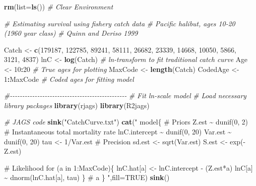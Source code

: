 \documentclass[
]{krantz}
\makeatletter
\newenvironment{Shaded}{\begin{snugshade}}{\end{snugshade}}
\newcommand{\AttributeTok}[1]{\textcolor[rgb]{0.27,0.27,0.27}{#1}}
\newcommand{\CommentTok}[1]{\textcolor[rgb]{0.37,0.37,0.37}{\textit{#1}}}
\newcommand{\ConstantTok}[1]{\textcolor[rgb]{0.37,0.37,0.37}{#1}}
\newcommand{\DecValTok}[1]{\textcolor[rgb]{0.06,0.06,0.06}{#1}}
\newcommand{\FunctionTok}[1]{\textcolor[rgb]{0.27,0.27,0.27}{\textbf{#1}}}
\newcommand{\NormalTok}[1]{#1}
\newcommand{\OtherTok}[1]{\textcolor[rgb]{0.37,0.37,0.37}{#1}}
\newcommand{\SpecialCharTok}[1]{\textcolor[rgb]{0.43,0.43,0.43}{\textbf{#1}}}
\newcommand{\StringTok}[1]{\textcolor[rgb]{0.5,0.5,0.5}{#1}}
\newenvironment{kframe}{%
\medskip{}
\setlength{\fboxsep}{.8em}
 \def\at@end@of@kframe{}%
 \ifinner\ifhmode%
  \def\at@end@of@kframe{\end{minipage}}%
  \begin{minipage}{\columnwidth}%
 \fi\fi%
 \def\FrameCommand##1{\hskip\@totalleftmargin \hskip-\fboxsep
 \colorbox{shadecolor}{##1}\hskip-\fboxsep
     \hskip-\linewidth \hskip-\@totalleftmargin \hskip\columnwidth}%
 \MakeFramed {\advance\hsize-\width
   \@totalleftmargin\z@ \linewidth\hsize
   \@setminipage}}%
 {\par\unskip\endMakeFramed%
 \at@end@of@kframe}
\renewenvironment{Shaded}{\begin{kframe}}{\end{kframe}}
\makeatother
\begin{document}
\begin{Shaded}
\begin{Highlighting}[]
\FunctionTok{rm}\NormalTok{(}\AttributeTok{list=}\FunctionTok{ls}\NormalTok{()) }\CommentTok{\# Clear Environment}

\CommentTok{\# Estimating survival using fishery catch data}
\CommentTok{\# Pacific halibut, ages 10{-}20 (1960 year class)}
\CommentTok{\# Quinn and Deriso 1999}

\NormalTok{Catch }\OtherTok{\textless{}{-}} \FunctionTok{c}\NormalTok{(}\DecValTok{179187}\NormalTok{, }\DecValTok{122785}\NormalTok{, }\DecValTok{89241}\NormalTok{, }\DecValTok{58111}\NormalTok{, }\DecValTok{26682}\NormalTok{, }\DecValTok{23339}\NormalTok{,}
           \DecValTok{14668}\NormalTok{, }\DecValTok{10050}\NormalTok{, }\DecValTok{5866}\NormalTok{, }\DecValTok{3121}\NormalTok{, }\DecValTok{4837}\NormalTok{)}
\NormalTok{lnC }\OtherTok{\textless{}{-}} \FunctionTok{log}\NormalTok{(Catch) }\CommentTok{\# ln{-}transform to fit traditional catch curve}
\NormalTok{Age }\OtherTok{\textless{}{-}} \DecValTok{10}\SpecialCharTok{:}\DecValTok{20} \CommentTok{\# True ages for plotting}
\NormalTok{MaxCode }\OtherTok{\textless{}{-}} \FunctionTok{length}\NormalTok{(Catch)}
\NormalTok{CodedAge }\OtherTok{\textless{}{-}} \DecValTok{1}\SpecialCharTok{:}\NormalTok{MaxCode }\CommentTok{\# Coded ages for fitting model}

\CommentTok{\#{-}{-}{-}{-}{-}{-}{-}{-}{-}{-}{-}{-}{-}{-}{-}{-}{-}{-}{-}{-}{-}{-}{-}{-}{-}{-}{-}{-}{-}{-}{-}{-}{-}{-}{-}{-}{-}{-}{-}{-}{-}{-}{-}{-}{-}{-}{-}}
\CommentTok{\# Fit ln{-}scale model}
\CommentTok{\# Load necessary library packages}
\FunctionTok{library}\NormalTok{(rjags)}
\FunctionTok{library}\NormalTok{(R2jags)}

\CommentTok{\# JAGS code}
\FunctionTok{sink}\NormalTok{(}\StringTok{"CatchCurve.txt"}\NormalTok{)}
\FunctionTok{cat}\NormalTok{(}\StringTok{"}
\StringTok{model\{}
\StringTok{    \# Priors}
\StringTok{    Z.est \textasciitilde{} dunif(0, 2) \# Instantaneous total mortality rate}
\StringTok{    lnC.intercept \textasciitilde{} dunif(0, 20)}
\StringTok{    Var.est \textasciitilde{} dunif(0, 20)}
\StringTok{    tau \textless{}{-} 1/Var.est \# Precision}
\StringTok{    sd.est \textless{}{-} sqrt(Var.est)}
\StringTok{    S.est \textless{}{-} exp({-}Z.est)}

\StringTok{    \# Likelihood}
\StringTok{    for (a in 1:MaxCode)\{}
\StringTok{      lnC.hat[a] \textless{}{-} lnC.intercept {-} (Z.est*a)}
\StringTok{      lnC[a] \textasciitilde{} dnorm(lnC.hat[a], tau)}
\StringTok{    \} \# a}
\StringTok{\}}
\StringTok{    "}\NormalTok{,}\AttributeTok{fill=}\ConstantTok{TRUE}\NormalTok{)}
\FunctionTok{sink}\NormalTok{()}


\end{Highlighting}
\end{Shaded}
\end{document}
